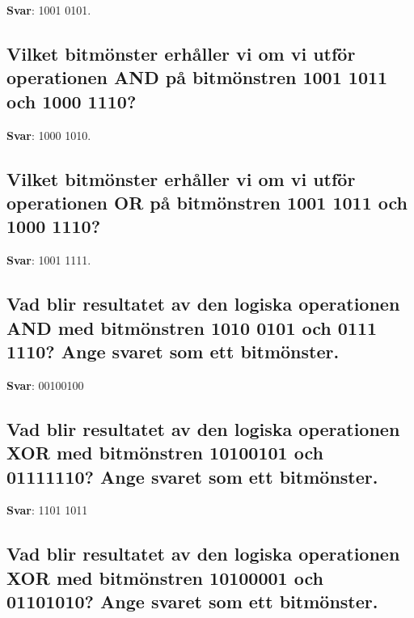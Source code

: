 \documentclass[a4paper,11pt,oneside]{article}
\begin{document}
\begin{sloppypar}
\label{q:406:sa:sv:True}

\textbf{Svar}: 1001 0101.



\subsection{Vilket bitm\"onster erh\r{a}ller vi om vi utf\"or operationen AND p\r{a} bitm\"onstren 1001 1011 och 1000 1110?}

\label{q:407:sa:sv:True}

\textbf{Svar}: 1000 1010.



\subsection{Vilket bitm\"onster erh\r{a}ller vi om vi utf\"or operationen OR p\r{a} bitm\"onstren 1001 1011 och 1000 1110?}

\label{q:408:sa:sv:True}

\textbf{Svar}: 1001 1111.



\subsection{Vad blir resultatet av den logiska operationen AND med bitm\"onstren 1010 0101 och 0111 1110? Ange svaret som ett bitm\"onster.}

\label{q:409:sa:sv:True}

\textbf{Svar}: 00100100



\subsection{Vad blir resultatet av den logiska operationen XOR med bitm\"onstren 10100101 och 01111110? Ange svaret som ett bitm\"onster.}

\label{q:410:sa:sv:True}

\textbf{Svar}: 1101 1011



\subsection{Vad blir resultatet av den logiska operationen XOR med bitm\"onstren 10100001 och 01101010? Ange svaret som ett bitm\"onster.}

\label{q:411:sa:sv:True}


\end{sloppypar}
\end{document}

